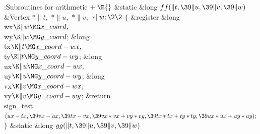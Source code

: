 \B{}:Subroutines for arithmetic\X${}\mathrel+\E{}$\6
\1\1\&{static} \&{long} ${}\\{ff}(\|t,\39\|u,\39\|v,\39\|w){}$\6
\&{Vertex} ${}{*}\|t,{}$ ${}{*}\|u,{}$ ${}{*}\|v,{}$ ${}{*}\|w;\2\2{}$\6
${}\{{}$\5
\1\&{register} \&{long} \\{wx}${}\K\|w\MG\\{x\_coord},{}$ \\{wy}${}\K\|w\MG\\{y%
\_coord}{}$;\6
\&{long} \\{tx}${}\K\|t\MG\\{x\_coord}-\\{wx},{}$ \\{ty}${}\K\|t\MG\\{y%
\_coord}-\\{wy}{}$;\6
\&{long} \\{ux}${}\K\|u\MG\\{x\_coord}-\\{wx},{}$ \\{uy}${}\K\|u\MG\\{y%
\_coord}-\\{wy}{}$;\6
\&{long} \\{vx}${}\K\|v\MG\\{x\_coord}-\\{wx},{}$ \\{vy}${}\K\|v\MG\\{y%
\_coord}-\\{wy}{}$;\7
\&{return} \\{sign\_test}${}(\\{ux}-\\{tx},\39\\{vx}-\\{ux},\39\\{tx}-\\{vx},%
\39\\{vx}*\\{vx}+\\{vy}*\\{vy},\39\\{tx}*\\{tx}+\\{ty}*\\{ty},\39\\{ux}*\\{ux}+%
\\{uy}*\\{uy});{}$\6
\4${}\}{}$\2\7
\1\1\&{static} \&{long} ${}\\{gg}(\|t,\39\|u,\39\|v,\39\|w){}$\6
